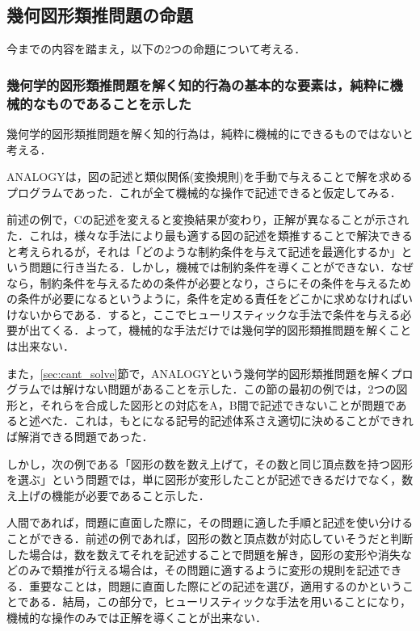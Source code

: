 \documentclass{jarticle}
\begin{document}
\subsection{幾何図形類推問題の命題}
今までの内容を踏まえ，以下の2つの命題について考える．



\subsubsection{幾何学的図形類推問題を解く知的行為の基本的な要素は，純粋に機械的なものであることを示した}
\label{sec:thesis1}
幾何学的図形類推問題を解く知的行為は，純粋に機械的にできるものではないと考える．

ANALOGYは，図の記述と類似関係(変換規則)を手動で与えることで解を求めるプログラムであった\cite{ref:automation}．これが全て機械的な操作で記述できると仮定してみる．

前述の例で，Cの記述を変えると変換結果が変わり，正解が異なることが示された．これは，様々な手法により最も適する図の記述を類推することで解決できると考えられるが，それは「どのような制約条件を与えて記述を最適化するか」という問題に行き当たる．しかし，機械では制約条件を導くことができない．なぜなら，制約条件を与えるための条件が必要となり，さらにその条件を与えるための条件が必要になるというように，条件を定める責任をどこかに求めなければいけないからである．すると，ここでヒューリスティックな手法で条件を与える必要が出てくる．よって，機械的な手法だけでは幾何学的図形類推問題を解くことは出来ない．

また，\ref{sec:cant_solve}節で，ANALOGYという幾何学的図形類推問題を解くプログラムでは解けない問題があることを示した．この節の最初の例では，2つの図形と，それらを合成した図形との対応をA，B間で記述できないことが問題であると述べた．これは，もとになる記号的記述体系さえ適切に決めることができれば解消できる問題であった．

しかし，次の例である「図形の数を数え上げて，その数と同じ頂点数を持つ図形を選ぶ」という問題では，単に図形が変形したことが記述できるだけでなく，数え上げの機能が必要であること示した．

人間であれば，問題に直面した際に，その問題に適した手順と記述を使い分けることができる．前述の例であれば，図形の数と頂点数が対応していそうだと判断した場合は，数を数えてそれを記述することで問題を解き，図形の変形や消失などのみで類推が行える場合は，その問題に適するように変形の規則を記述できる．重要なことは，問題に直面した際にどの記述を選び，適用するのかということである．結局，この部分で，ヒューリスティックな手法を用いることになり，機械的な操作のみでは正解を導くことが出来ない．
\end{document}
